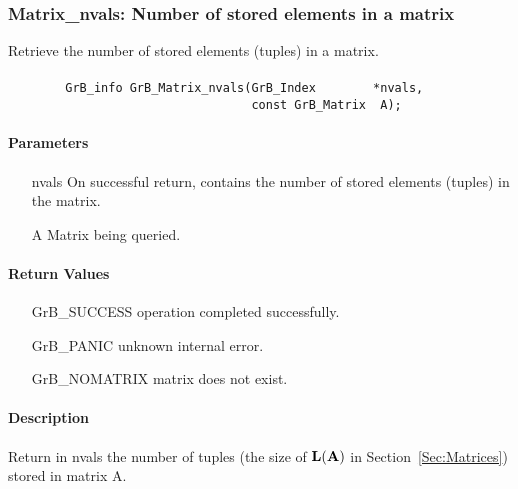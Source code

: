 \subsubsection{{\sf Matrix\_nvals}: Number of stored elements in a matrix}

Retrieve the number of stored elements (tuples) in a matrix.

\paragraph{\syntax}

\begin{verbatim}
        GrB_info GrB_Matrix_nvals(GrB_Index        *nvals,
                                  const GrB_Matrix  A);
\end{verbatim}

\paragraph{Parameters}

\begin{itemize}[leftmargin=1.1in]
    \item[{\sf nvals}] On successful return, contains the number of stored elements (tuples) 
    in the matrix.
    \item[{\sf A}] Matrix being queried.
\end{itemize}

\paragraph{Return Values}

\begin{itemize}[leftmargin=2.1in]
\item[{\sf GrB\_SUCCESS}]   operation completed successfully.
\item[{\sf GrB\_PANIC}]     unknown internal error.
\item[{\sf GrB\_NOMATRIX}]  matrix does not exist.
\end{itemize}

\paragraph{Description}

Return in {\sf nvals} the number of tuples (the size of $\bold{L}({\bf A})$
in Section~\ref{Sec:Matrices}) stored in matrix {\sf A}.
